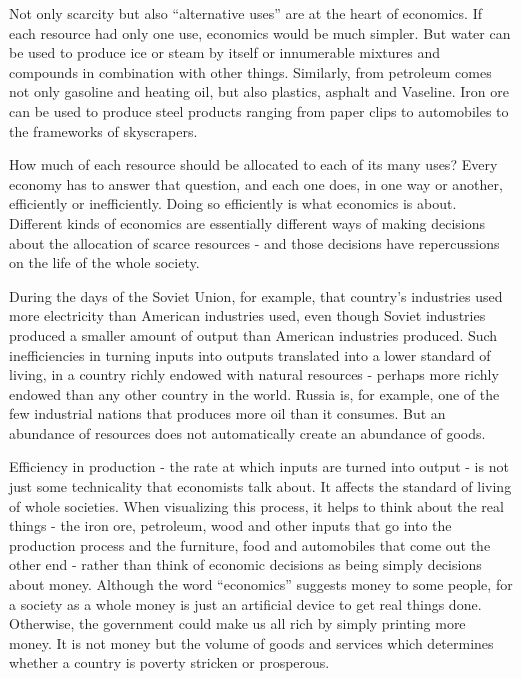 Not only scarcity but also ``alternative uses'' are at the heart of economics. If each resource had only one use, economics would be much simpler. But water can be used to produce ice or steam by itself or innumerable mixtures and compounds in combination with other things. Similarly, from petroleum comes not only gasoline and heating oil, but also plastics, asphalt and Vaseline. Iron ore can be used to produce steel products ranging from paper clips to automobiles to the frameworks of skyscrapers.

How much of each resource should be allocated to each of its many uses?  Every economy has to answer that question, and each one does, in one way or another, efficiently or inefficiently. Doing so efficiently is what economics is about. Different kinds of economics are essentially different ways of making decisions about the allocation of scarce resources - and those decisions have repercussions on the life of the whole society.

During the days of the Soviet Union, for example, that country’s industries used more electricity than American industries used, even though Soviet industries produced a smaller amount of output than American industries produced. Such inefficiencies in turning inputs into outputs translated into a lower standard of living, in a country richly endowed with natural resources - perhaps more richly endowed than any other country in the world. Russia is, for example, one of the few industrial nations that produces more oil than it consumes. But an abundance of resources does not automatically create an abundance of goods.

Efficiency in production - the rate at which inputs are turned into output - is not just some technicality that economists talk about. It affects the standard of living of whole societies. When visualizing this process, it helps to think about the real things - the iron ore, petroleum, wood and other inputs that go into the production process and the furniture, food and automobiles that come out the other end - rather than think of economic decisions as being simply decisions about money. Although the word ``economics'' suggests money to some people, for a society as a whole money is just an artificial device to get real things done. Otherwise, the government could make us all rich by simply printing more money. It is not money but the volume of goods and services which determines whether a country is poverty stricken or prosperous.